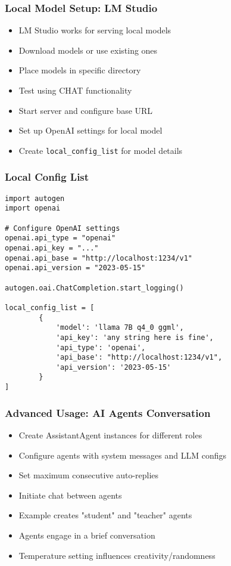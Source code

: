 \begin{frame}[fragile]\frametitle{Local Model Setup: LM Studio}
\begin{itemize}
\item LM Studio works for serving local models
\item Download models or use existing ones
\item Place models in specific directory
\item Test using CHAT functionality
\item Start server and configure base URL
\item Set up OpenAI settings for local model
\item Create \lstinline|local_config_list| for model details
\end{itemize}
\end{frame}

\begin{frame}[fragile]\frametitle{Local Config List}

\begin{lstlisting}
import autogen
import openai

# Configure OpenAI settings
openai.api_type = "openai"
openai.api_key = "..."
openai.api_base = "http://localhost:1234/v1"
openai.api_version = "2023-05-15"

autogen.oai.ChatCompletion.start_logging()

local_config_list = [
        {
            'model': 'llama 7B q4_0 ggml',
            'api_key': 'any string here is fine',
            'api_type': 'openai',
            'api_base': "http://localhost:1234/v1",
            'api_version': '2023-05-15'
        }
]
\end{lstlisting}
\end{frame}

\begin{frame}[fragile]\frametitle{Advanced Usage: AI Agents Conversation}
\begin{itemize}
\item Create AssistantAgent instances for different roles
\item Configure agents with system messages and LLM configs
\item Set maximum consecutive auto-replies
\item Initiate chat between agents
\item Example creates "student" and "teacher" agents
\item Agents engage in a brief conversation
\item Temperature setting influences creativity/randomness
\end{itemize}
\end{frame}


